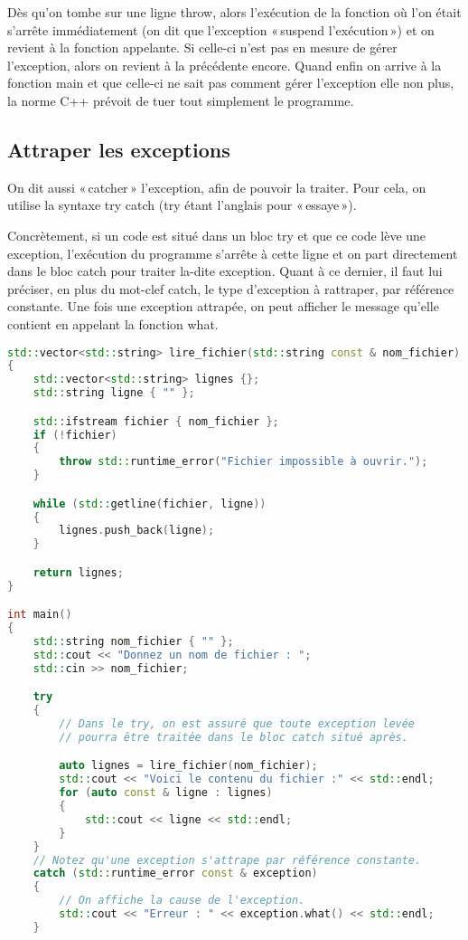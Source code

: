 \documentclass{article}
\begin{document}
\begin{itemize}
Dès qu’on tombe sur une ligne throw, alors l’exécution de la fonction où l’on était s’arrête immédiatement (on dit que l’exception « suspend l’exécution ») et on revient à la fonction appelante. Si celle-ci n’est pas en mesure de gérer l’exception, alors on revient à la précédente encore. Quand enfin on arrive à la fonction main et que celle-ci ne sait pas comment gérer l’exception elle non plus, la norme C++ prévoit de tuer tout simplement le programme.

\subsection{Attraper les exceptions}
On dit aussi « catcher » l’exception, afin de pouvoir la traiter. Pour cela, on utilise la syntaxe try catch (try étant l’anglais pour « essaye »).

Concrètement, si un code est situé dans un bloc try et que ce code lève une exception, l’exécution du programme s’arrête à cette ligne et on part directement dans le bloc catch pour traiter la-dite exception. Quant à ce dernier, il faut lui préciser, en plus du mot-clef catch, le type d’exception à rattraper, par référence constante. Une fois une exception attrapée, on peut afficher le message qu’elle contient en appelant la fonction what.

\begin{lstlisting}[language=C++]
std::vector<std::string> lire_fichier(std::string const & nom_fichier)
{
    std::vector<std::string> lignes {};
    std::string ligne { "" };

    std::ifstream fichier { nom_fichier };
    if (!fichier)
    {
        throw std::runtime_error("Fichier impossible à ouvrir.");
    }

    while (std::getline(fichier, ligne))
    {
        lignes.push_back(ligne);
    }

    return lignes;
}

int main()
{
    std::string nom_fichier { "" };
    std::cout << "Donnez un nom de fichier : ";
    std::cin >> nom_fichier;

    try
    {
        // Dans le try, on est assuré que toute exception levée
        // pourra être traitée dans le bloc catch situé après.

        auto lignes = lire_fichier(nom_fichier);
        std::cout << "Voici le contenu du fichier :" << std::endl;
        for (auto const & ligne : lignes)
        {
            std::cout << ligne << std::endl;
        }
    }
    // Notez qu'une exception s'attrape par référence constante.
    catch (std::runtime_error const & exception)
    {
        // On affiche la cause de l'exception.
        std::cout << "Erreur : " << exception.what() << std::endl;
    }
\end{lstlisting}{}


\end{itemize}
\end{document}
